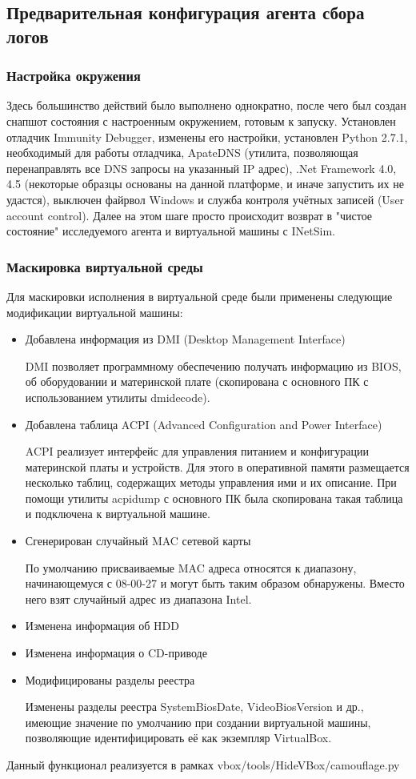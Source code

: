 \subsection {Предварительная конфигурация  агента сбора логов}
\subsubsection {Настройка окружения}
Здесь большинство действий было выполнено однократно, после чего был создан снапшот состояния с настроенным окружением, готовым к запуску. Установлен отладчик Immunity Debugger, изменены его настройки, установлен Python 2.7.1, необходимый для работы отладчика, ApateDNS (утилита, позволяющая перенаправлять все DNS запросы на указанный IP адрес), .Net Framework 4.0, 4.5 (некоторые образцы основаны на данной платформе, и иначе запустить их не удастся), выключен файрвол Windows и служба контроля учётных записей (User account control).
Далее на этом шаге просто происходит возврат в "чистое состояние" исследуемого агента и виртуальной машины с INetSim.
\subsubsection {Маскировка виртуальной среды}
Для маскировки исполнения в виртуальной среде были применены следующие модификации виртуальной машины:
\begin {itemize}
	\item Добавлена информация из DMI (Desktop Management Interface)

	DMI позволяет программному обеспечению получать информацию из BIOS, об оборудовании и материнской плате (скопирована с основного ПК с использованием утилиты dmidecode).
	\item Добавлена таблица ACPI (Advanced Configuration and Power Interface)

	ACPI реализует интерфейс для управления питанием и конфигурации материнской платы и устройств. Для этого в оперативной памяти размещается несколько таблиц, содержащих методы управления ими и их описание. При помощи утилиты acpidump с основного ПК была скопирована такая таблица и подключена к виртуальной машине.
	\item Сгенерирован случайный MAC сетевой карты

	По умолчанию присваиваемые MAC адреса относятся к диапазону, начинающемуся с 08-00-27 и могут быть таким образом обнаружены. Вместо него взят случайный адрес из диапазона Intel.
	\item Изменена информация об HDD
	\item Изменена информация о CD-приводе
	\item Модифицированы разделы реестра

	Изменены разделы реестра SystemBiosDate, VideoBiosVersion и др., имеющие значение по умолчанию при создании виртуальной машины, позволяющие идентифицировать её как экземпляр VirtualBox.
\end {itemize}
Данный функционал реализуется в рамках vbox/tools/HideVBox/camouflage.py

